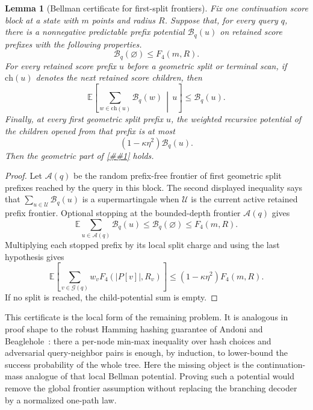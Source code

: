 \documentclass[10pt]{article}
\newcommand{\cref}[1]{\ref{##1}}
\newtheorem{lemma}[theorem]{Lemma}
\theoremstyle{definition}
\newcommand{\E}{\mathbb{E}}
\begin{document}
\begin{lemma}[Bellman certificate for first-split frontiers]\label{lem:bellman-frontier-certificate}
   Fix one continuation score block at a state with $m$ points and radius $R$. Suppose that, for every query $q$, there is a nonnegative predictable prefix potential $\mathcal B_q(u)$ on retained score prefixes with the following properties.
   \[
      \mathcal B_q(\varnothing)\le F_4(m,R).
   \]
   For every retained score prefix $u$ before a geometric split or terminal scan, if $\mathrm{ch}(u)$ denotes the next retained score children, then
   \[
      \E\left[\sum_{w\in\mathrm{ch}(u)}\mathcal B_q(w)\,\middle|\,u\right]
      \le
      \mathcal B_q(u).
   \]
   Finally, at every first geometric split prefix $u$, the weighted recursive potential of the children opened from that prefix is at most
   \[
      (1-\kappa\eta^2)\mathcal B_q(u).
   \]
   Then the geometric part of \cref{asm:mixed-continuation-operator} holds.
\end{lemma}

\begin{proof}
   Let $\mathcal A(q)$ be the random prefix-free frontier of first geometric split prefixes reached by the query in this block. The second displayed inequality says that $\sum_{u\in\mathcal U}\mathcal B_q(u)$ is a supermartingale when $\mathcal U$ is the current active retained prefix frontier. Optional stopping at the bounded-depth frontier $\mathcal A(q)$ gives
   \[
      \E\sum_{u\in\mathcal A(q)}\mathcal B_q(u)
      \le
      \mathcal B_q(\varnothing)
      \le
      F_4(m,R).
   \]
   Multiplying each stopped prefix by its local split charge and using the last hypothesis gives
   \[
      \E\left[
         \sum_{v\in\mathcal G(q)}w_vF_4(|P[v]|,R_v)
      \right]
      \le
      (1-\kappa\eta^2)F_4(m,R).
   \]
   If no split is reached, the child-potential sum is empty.
\end{proof}

This certificate is the local form of the remaining problem. It is analogous in proof shape to the robust Hamming hashing guarantee of Andoni and Beaglehole~\cite{AB22}: there a per-node min-max inequality over hash choices and adversarial query-neighbor pairs is enough, by induction, to lower-bound the success probability of the whole tree. Here the missing object is the continuation-mass analogue of that local Bellman potential. Proving such a potential would remove the global frontier assumption without replacing the branching decoder by a normalized one-path law.
\end{document}
